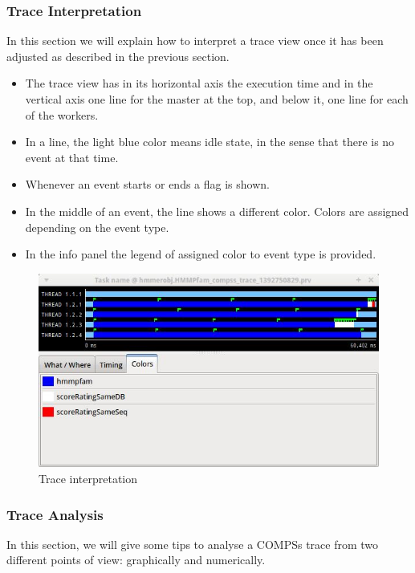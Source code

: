 \subsubsection{Trace Interpretation}
In this section we will explain how to interpret a trace view once it has been adjusted as 
described in the previous section.

\begin{itemize}
 \item The trace view has in its horizontal axis the execution time and in the vertical 
       axis one line for the master at the top, and below it, one line for each of the workers.
 \item In a line, the light blue color means idle state, in the sense that there is no event at that time.
 \item Whenever an event starts or ends a flag is shown.
 \item In the middle of an event, the line shows a different color. Colors are assigned depending on the event type.
 \item In the info panel the legend of assigned color to event type is provided.
\end{itemize}

\begin{figure}[ht!]
  \centering
    \includegraphics[width=1.0\textwidth]{./Sections/4_Tools/Figures/7.jpeg}
    \caption{Trace interpretation}
\end{figure}


\subsubsection{Trace Analysis}
In this section, we will give some tips to analyse a COMPSs trace from two different points of view:
graphically and numerically.

